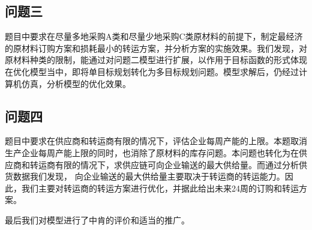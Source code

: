 \subsection{问题三}
题目中要求在尽量多地采购A类和尽量少地采购C类原材料的前提下，制定最经济的原材料订购方案和损耗最小的转运方案，并分析方案的实施效果。我们发现，对原材料种类的限制，能通过对问题二模型进行扩展，以作用于目标函数的形式体现在优化模型当中，即将单目标规划转化为多目标规划问题。模型求解后，仍经过计算机仿真，分析模型的优化效果。

\subsection{问题四}
题目中要求在供应商和转运商有限的情况下，评估企业每周产能的上限。本题取消生产企业每周产能上限的同时，也消除了原材料的库存问题。本问题也转化为在供应商和转运商有限的情况下，求供应链可向企业输送的最大供给量。而通过分析供货数据我们发现，
向企业输送的最大供给量主要取决于转运商的转运能力。因此，我们主要对转运商的转运方案进行优化，并据此给出未来24周的订购和转运方案。

最后我们对模型进行了中肯的评价和适当的推广。